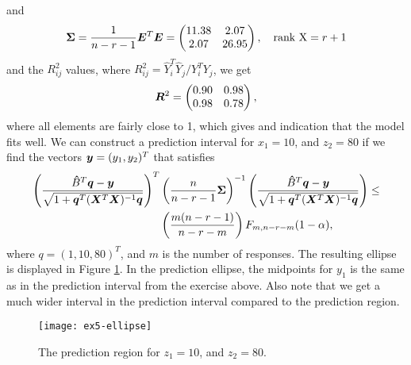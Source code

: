 and
\begin{equation*}
  \bm{\Sigma} = \frac{1}{n-r-1} \bm{E} ^{T} \bm{E} = 
  \begin{pmatrix}
    11.38 &2.07 \\ 
    2.07 &26.95  
  \end{pmatrix},\quad \text{rank X} = r+1
\end{equation*}
and the $R^{2}_{ij}$ values, where $R^{2}_{ij} =  \hat Y_{i}^{T} 
\hat Y_{j} /  Y_{i}^{T} Y_{j}$, we get
\begin{equation*}
  \bm{R}^{2} =
  \begin{pmatrix}
    0.90 &0.98 \\ 
    0.98 &0.78
  \end{pmatrix},
\end{equation*}
where all elements are fairly close to 1, which gives and indication
that the model fits well. We can construct a prediction interval for
$x_{1} = 10$, and $z_{2} = 80$ if we find the vectors $\bm{y} =
(y_{1}, y_{2})^{T}$ that
satisfies
\begin{align*}
  \left(
    \frac{\bm{\hat} B^{T} \bm{q} - \bm{y}}{\sqrt{1 + \bm{q}^{T}(\bm{X}^{T} \bm{X})^{-1}\bm{q}}}
  \right)^{T} &
  \left(
    \frac{n}{n-r-1}\bm{\Sigma}
  \right)^{-1}
   \left(
    \frac{\bm{\hat} B^{T} \bm{q} - \bm{y}}{\sqrt{1 + \bm{q}^{T}(\bm{X}^{T} \bm{X})^{-1}\bm{q}}}
  \right)
\leq \\
  &
    \left(
    \frac{m(n-r-1)}{n-r-m}
    \right)
    F_{m,n-r-m}(1-\alpha),
\end{align*}
where $q = (1, 10, 80)^{T}$, and $m$ is the number of responses. The
resulting ellipse is displayed in Figure \ref{fig:ex5-ellipse}. In the
prediction ellipse, the midpoints for $y_{1}$
is the same as in the prediction interval from the exercise above. Also
note that we get a much wider interval in the
prediction interval compared to the prediction region. 

\begin{figure}
  \centering
  \texttt{[image: ex5-ellipse]}
  \caption{The prediction region for $z_1 = 10$, and $z_2 = 80$.}
  \label{fig:ex5-ellipse}
\end{figure}


